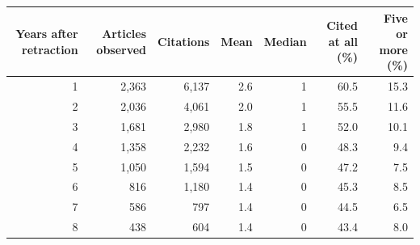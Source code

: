 
\begin{tabular}[t]{rrrrrrr}
\toprule
Years after retraction & Articles observed & Citations & Mean & Median & Cited at all (\%) & Five or more (\%)\\
\midrule
1 & 2,363 & 6,137 & 2.6 & 1 & 60.5 & 15.3\\
2 & 2,036 & 4,061 & 2.0 & 1 & 55.5 & 11.6\\
3 & 1,681 & 2,980 & 1.8 & 1 & 52.0 & 10.1\\
4 & 1,358 & 2,232 & 1.6 & 0 & 48.3 & 9.4\\
5 & 1,050 & 1,594 & 1.5 & 0 & 47.2 & 7.5\\
6 & 816 & 1,180 & 1.4 & 0 & 45.3 & 8.5\\
7 & 586 & 797 & 1.4 & 0 & 44.5 & 6.5\\
8 & 438 & 604 & 1.4 & 0 & 43.4 & 8.0\\
\bottomrule
\end{tabular}
